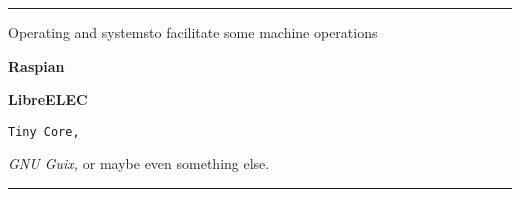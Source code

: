 
\hrule
\vskip 1in
\centerline{Operating and systemsto facilitate some machine operations}
\vskip17pt
\centerline{\bf Raspian}
\vskip         8.5pt
\centerline{\bf LibreELEC}
{\tt Tiny Core,} %

{\it GNU Guix,}
or maybe even something else.
\vskip72pt
\hrule
\vfill\eject
